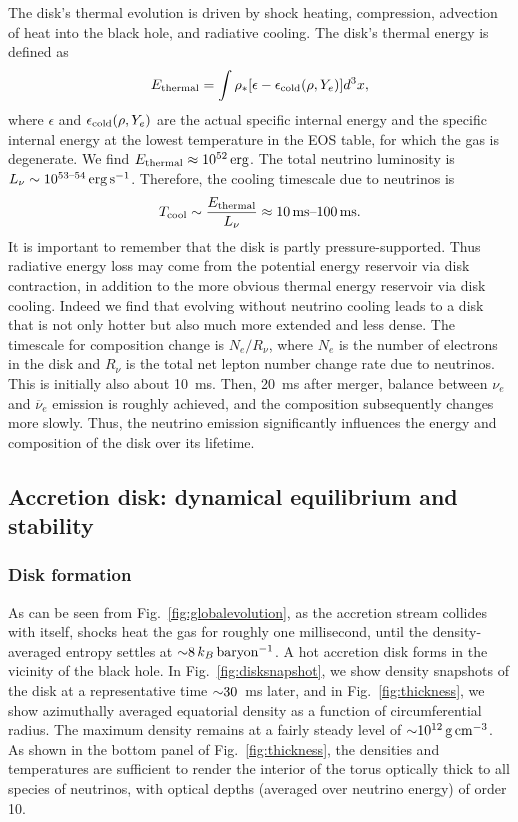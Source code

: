 The disk's thermal evolution is driven by shock heating, compression,
advection of heat into the black hole, and radiative cooling. 
The disk's thermal energy is defined as
\begin{equation}
E_{\rm thermal}=\int \rho_*[\epsilon - \epsilon_{\rm cold}(\rho,Y_e)]d^3x,
\end{equation}
where $\epsilon$ and $\epsilon_{\rm cold}(\rho,Y_e)$ are the actual
specific internal energy and the specific internal energy at the
lowest temperature in the EOS table, for which the gas is degenerate. 
We find $E_{\rm thermal}\approx 10^{52}\rm\,erg$. 
The total neutrino luminosity is $L_{\nu} \sim 10^{53\text{--}54}\rm\,erg\,s^{-1}$. 
Therefore, the cooling timescale due to neutrinos is
\begin{equation}
T_{\rm cool}\sim \frac{E_{\rm thermal}}{L_{\nu}} \approx 10{\rm\,ms}\text{--}100{\rm\,ms}.
\end{equation}
It is important to remember that the disk is partly pressure-supported.
Thus radiative energy loss
may come from the potential energy reservoir via disk contraction,
in addition to the more obvious thermal energy reservoir via disk cooling.
Indeed we find that evolving without neutrino cooling
leads to a disk that is not only hotter but also much more extended and
less dense.  The timescale for composition change
is $N_e/R_{\nu}$, where $N_e$ is the number of electrons in the disk and
$R_{\nu}$ is the total net lepton number change rate due to neutrinos. 
This is initially also about
10~ms.  Then, 20~ms after merger, balance between $\nu_e$ and $\overline{\nu}_e$
emission is roughly achieved, and the
composition subsequently changes more slowly.   Thus, the neutrino emission
significantly influences the energy and composition of the disk over its
lifetime.

\subsection{Accretion disk:  dynamical equilibrium and stability}
\label{sec:disk}

\subsubsection{Disk formation}

As can be seen from Fig.~\ref{fig:globalevolution},
as the accretion stream collides with itself, shocks heat
the gas for roughly one millisecond, until the density-averaged
entropy settles at $\mathord{\sim} 8\,k_B\,\rm baryon^{-1}$. 
A hot accretion disk forms in the vicinity of the black hole.  In
Fig.~\ref{fig:disksnapshot}, we show density snapshots
of the disk at a representative time $\mathord{\sim} 30$~ms later,
and in Fig.~\ref{fig:thickness}, we show
azimuthally averaged equatorial density as
a function of circumferential radius.  The maximum density remains at a fairly
steady level of $\mathord{\sim} 10^{12}\rm\,g\,cm^{-3}$.  As shown in the bottom
panel of Fig.~\ref{fig:thickness}, the densities and temperatures
are sufficient to render the interior of the torus optically thick
to all species of neutrinos, with optical depths (averaged over
neutrino energy) of order 10.


